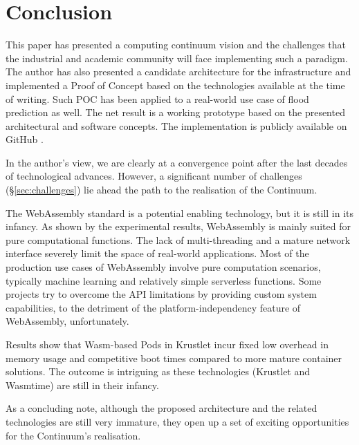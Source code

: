 \section{Conclusion}
\label{sec:conclusion}

This paper has presented a computing continuum vision and the challenges that the industrial and academic community will face implementing such a paradigm. The author has also presented a candidate architecture for the infrastructure and implemented a Proof of Concept based on the technologies available at the time of writing. Such POC has been applied to a real-world use case of flood prediction as well. The net result is a working prototype based on the presented architectural and software concepts. The implementation is publicly available on GitHub \cite{fedra-thesis}. 

In the author's view, we are clearly at a convergence point after the last decades of technological advances. However, a significant number of challenges (§\ref{sec:challenges}) lie ahead the path to the realisation of the Continuum.

The WebAssembly standard is a potential enabling technology, but it is still in its infancy. As shown by the experimental results, WebAssembly is mainly suited for pure computational functions. The lack of multi-threading and a mature network interface severely limit the space of real-world applications. Most of the production use cases of WebAssembly involve pure computation scenarios, typically machine learning and relatively simple serverless functions. Some projects try to overcome the API limitations by providing custom system capabilities, to the detriment of the platform-independency feature of WebAssembly, unfortunately.

{\color{red}
Results show that Wasm-based Pods in Krustlet incur fixed low overhead in memory usage and competitive boot times compared to more mature container solutions. The outcome is intriguing as these technologies (Krustlet and Wasmtime) are still in their infancy.

As a concluding note, although the proposed architecture and the related technologies are still very immature, they open up a set of exciting opportunities for the Continuum's realisation.
}
